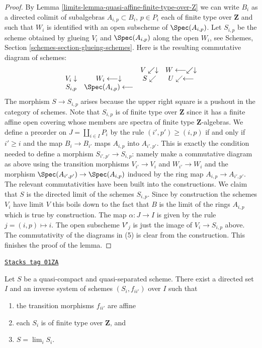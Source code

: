 \begin{proof}
\medskip\noindent
By Lemma \ref{limits-lemma-quasi-affine-finite-type-over-Z}
we can write $B_i$ as a directed colimit of subalgebras
$A_{i, p} \subset B_i$, $p \in P_i$ each
of finite type over $\mathbf{Z}$ and such that $W_i$ is
identified with an open subscheme of $\Spec(A_{i, p})$.
Let $S_{i, p}$ be the scheme obtained by glueing
$V_i$ and $\Spec(A_{i, p})$ along the open $W_i$, see
Schemes, Section \ref{schemes-section-glueing-schemes}.
Here is the resulting commutative diagram of schemes:
$$
\begin{array}{cccc} &  & V \swarrow\downarrow & W \longleftarrow\swarrow\downarrow \\ V_i \downarrow & W_i \longleftarrow\downarrow & S \swarrow & U \swarrow\longleftarrow \\ S_{i, p} & \Spec(A_{i, p}) \longleftarrow &  & \end{array}
$$
The morphism $S \to S_{i, p}$ arises because the upper right
square is a pushout in the category of schemes.
Note that $S_{i, p}$ is of finite type over $\mathbf{Z}$ since
it has a finite affine open covering whose members are
spectra of finite type $\mathbf{Z}$-algebras.
We define a preorder on $J = \coprod_{i \in I} P_i$
by the rule $(i', p') \geq (i, p)$ if and only if
$i' \geq i$ and the map $B_i \to B_{i'}$ maps $A_{i, p}$ into
$A_{i', p'}$. This is exactly the condition needed to
define a morphism $S_{i', p'} \to S_{i, p}$: namely make a commutative
diagram as above using the transition morphisms $V_{i'} \to V_i$
and $W_{i'} \to W_i$ and
the morphism $\Spec(A_{i', p'}) \to \Spec(A_{i, p})$ induced
by the ring map $A_{i, p} \to A_{i', p'}$. The relevant commutativities
have been built into the constructions.
We claim that $S$ is the directed limit of the schemes $S_{i, p}$.
Since by construction the schemes $V_i$ have limit $V$ this boils
down to the fact that $B$ is the limit of the rings $A_{i, p}$
which is true by construction. The map $\alpha : J \to I$ is given
by the rule $j = (i, p) \mapsto i$. The open subscheme $V'_j$ is
just the image of $V_i \to S_{i, p}$ above. The commutativity of
the diagrams in (5) is clear from the construction.
This finishes the proof of the lemma.
\end{proof}

\begin{proposition}[Approximate]
\label{limits-proposition-approximate}
\href{https://stacks.math.columbia.edu/tag/01ZA}{\texttt{Stacks tag 01ZA}}

Let $S$ be a quasi-compact and quasi-separated scheme.
There exist a directed set $I$
and an inverse system of schemes $(S_i, f_{ii'})$ over $I$
such that
\begin{enumerate}
\item the transition morphisms $f_{ii'}$ are affine
\item each $S_i$ is of finite type over $\mathbf{Z}$, and
\item $S = \lim_i S_i$.
\end{enumerate}
\end{proposition}

